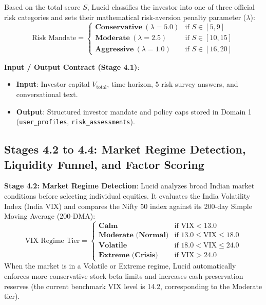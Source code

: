 Based on the total score $S$, Lucid classifies the investor into one of three official risk categories and sets their mathematical risk-aversion penalty parameter ($\lambda$):
\begin{equation}
\text{Risk Mandate} = 
\begin{cases} 
\textbf{Conservative} \ (\lambda = 5.0) & \text{if } S \in [5, 9] \\ 
\textbf{Moderate} \ (\lambda = 2.5) & \text{if } S \in [10, 15] \\ 
\textbf{Aggressive} \ (\lambda = 1.0) & \text{if } S \in [16, 20] 
\end{cases}
\end{equation}

\noindent \textbf{Input / Output Contract (Stage 4.1)}:
\begin{itemize}
    \item \textbf{Input}: Investor capital $V_{\text{total}}$, time horizon, 5 risk survey answers, and conversational text.
    \item \textbf{Output}: Structured investor mandate and policy caps stored in Domain 1 (\texttt{user\_profiles}, \texttt{risk\_assessments}).
\end{itemize}

\subsection{Stages 4.2 to 4.4: Market Regime Detection, Liquidity Funnel, and Factor Scoring}

\noindent \textbf{Stage 4.2: Market Regime Detection}:
Lucid analyzes broad Indian market conditions before selecting individual equities. It evaluates the India Volatility Index (India VIX) and compares the Nifty 50 index against its 200-day Simple Moving Average (200-DMA):
\begin{equation}
\text{VIX Regime Tier} = 
\begin{cases}
\textbf{Calm} & \text{if } \text{VIX} < 13.0 \\
\textbf{Moderate (Normal)} & \text{if } 13.0 \le \text{VIX} \le 18.0 \\
\textbf{Volatile} & \text{if } 18.0 < \text{VIX} \le 24.0 \\
\textbf{Extreme (Crisis)} & \text{if } \text{VIX} > 24.0
\end{cases}
\end{equation}
When the market is in a Volatile or Extreme regime, Lucid automatically enforces more conservative stock beta limits and increases cash preservation reserves (the current benchmark VIX level is 14.2, corresponding to the Moderate tier).

